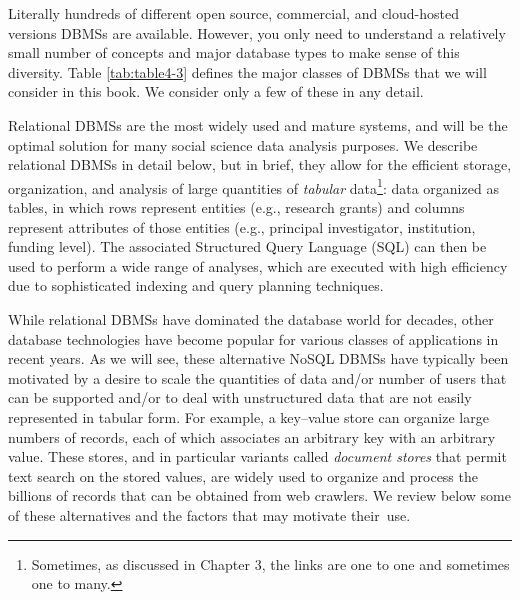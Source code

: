 \documentclass[]{krantz}
\begin{document}
\vspace*{12pt} Literally hundreds of different open source, commercial,
and cloud-hosted versions DBMSs are available. However, you only need to
understand a relatively small number of concepts and major database
types to make sense of this diversity. Table \ref{tab:table4-3} defines
the major classes of DBMSs that we will consider in this book. We
consider only a few of these in any detail.

Relational DBMSs are the most widely used and mature systems, and will
be the optimal solution for many social science data analysis purposes.
We describe relational DBMSs in detail below, but in brief, they allow
for the efficient storage, organization, and analysis of large
quantities of \emph{tabular} data\footnote{Sometimes, as discussed in
  Chapter 3, the links are one to one and sometimes one to many.}: data
organized as tables, in which rows represent entities (e.g., research
grants) and columns represent attributes of those entities (e.g.,
principal investigator, institution, funding level). The associated
Structured Query Language (SQL) can then be used to perform a wide range
of analyses, which are executed with high efficiency due to
sophisticated indexing and query planning techniques.

\enlargethispage{-12pt} While relational DBMSs have dominated the
database world for decades, other database technologies have become
popular for various classes of applications in recent years. As we will
see, these alternative NoSQL DBMSs have typically been motivated by a
desire to scale the quantities of data and/or number of users that can
be supported and/or to deal with unstructured data that are not easily
represented in tabular form. For example, a key--value store can
organize large numbers of records, each of which associates an arbitrary
key with an arbitrary value. These stores, and in particular variants
called \emph{document stores} that permit text search on the stored
values, are widely used to organize and process the billions of records
that can be obtained from web crawlers. We review below some of these
alternatives and the factors that may motivate their~use.
\end{document}
